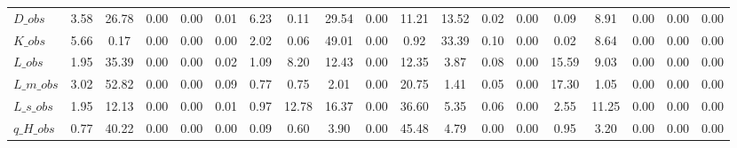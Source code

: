 \begin{center}
\begin{longtable}{lcccccccccccccccccc}
$D\_obs             $	 & 	             3.58	 & 	            26.78	 & 	             0.00	 & 	             0.00	 & 	             0.01	 & 	             6.23	 & 	             0.11	 & 	            29.54	 & 	             0.00	 & 	            11.21	 & 	            13.52	 & 	             0.02	 & 	             0.00	 & 	             0.09	 & 	             8.91	 & 	             0.00	 & 	             0.00	 & 	             0.00 \\ 
$K\_obs             $	 & 	             5.66	 & 	             0.17	 & 	             0.00	 & 	             0.00	 & 	             0.00	 & 	             2.02	 & 	             0.06	 & 	            49.01	 & 	             0.00	 & 	             0.92	 & 	            33.39	 & 	             0.10	 & 	             0.00	 & 	             0.02	 & 	             8.64	 & 	             0.00	 & 	             0.00	 & 	             0.00 \\ 
$L\_obs             $	 & 	             1.95	 & 	            35.39	 & 	             0.00	 & 	             0.00	 & 	             0.02	 & 	             1.09	 & 	             8.20	 & 	            12.43	 & 	             0.00	 & 	            12.35	 & 	             3.87	 & 	             0.08	 & 	             0.00	 & 	            15.59	 & 	             9.03	 & 	             0.00	 & 	             0.00	 & 	             0.00 \\ 
$L\_m\_obs          $	 & 	             3.02	 & 	            52.82	 & 	             0.00	 & 	             0.00	 & 	             0.09	 & 	             0.77	 & 	             0.75	 & 	             2.01	 & 	             0.00	 & 	            20.75	 & 	             1.41	 & 	             0.05	 & 	             0.00	 & 	            17.30	 & 	             1.05	 & 	             0.00	 & 	             0.00	 & 	             0.00 \\ 
$L\_s\_obs          $	 & 	             1.95	 & 	            12.13	 & 	             0.00	 & 	             0.00	 & 	             0.01	 & 	             0.97	 & 	            12.78	 & 	            16.37	 & 	             0.00	 & 	            36.60	 & 	             5.35	 & 	             0.06	 & 	             0.00	 & 	             2.55	 & 	            11.25	 & 	             0.00	 & 	             0.00	 & 	             0.00 \\ 
$q\_H\_obs          $	 & 	             0.77	 & 	            40.22	 & 	             0.00	 & 	             0.00	 & 	             0.00	 & 	             0.09	 & 	             0.60	 & 	             3.90	 & 	             0.00	 & 	            45.48	 & 	             4.79	 & 	             0.00	 & 	             0.00	 & 	             0.95	 & 	             3.20	 & 	             0.00	 & 	             0.00	 & 	             0.00 \\ 

\end{longtable}
\end{center}
